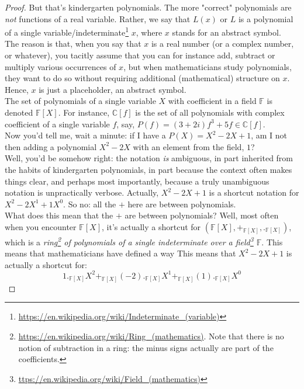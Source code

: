 \documentclass[solutions.tex]{subfiles}
\begin{document}
\begin{proof}
But that's kindergarten polynomials. The more "correct"
polynomials are \textit{not} functions of a real variable. Rather,
we say that $L(x)$ or $L$ is a polynomial of a single
variable/indeterminate\footnote{
\url{https://en.wikipedia.org/wiki/Indeterminate\_(variable)}} $x$, where
$x$ stands for an abstract symbol. \\

The reason is that, when you say that $x$ is a real number (or
a complex number, or whatever), you tacitly assume that you can
for instance add, subtract or multiply various occurrences of
$x$, but when mathematicians study polynomials, they want to do
so without requiring additional (mathematical) structure on $x$. \\

Hence, $x$ is just a placeholder, an abstract symbol. \\

The set of polynomials of a single variable $X$ with coefficient
in a field $\mathbb{F}$ is denoted $\mathbb{F}[X]$. For instance,
$\mathbb{C}[f]$ is the set of all polynomials with complex
coefficient of a single variable $f$, say,
$P(f) = (3+2i)f^3 + 5f \in \mathbb{C}[f]$. \\

Now you'd tell me, wait a minute: if I have a $P(X) = X^2 - 2X +1$,
am I not then adding a polynomial $X^2-2X$ with an element from
the field, $1$? \\

Well, you'd be somehow right: the notation \textit{is} ambiguous, in
part inherited from the habits of kindergarten polynomials, in part
because the context often makes things clear, and perhaps
most importantly, because a truly unambiguous notation is unpractically
verbose. Actually, $X^2 - 2X +1$ is a shortcut
notation for $X^2 - 2X^1 +1 X^0$. So no: all the $+$ here are between
polynomials. \\

What does this mean that the $+$ are between polynomials? Well, most
often when you encounter $\mathbb{F}[X]$, it's actually
a shortcut for $(\mathbb{F}[X], +_{\mathbb{F}[X]}, ._{\mathbb{F}[X]})$,
which is a \textit{ring\footnote{\url{
https://en.wikipedia.org/wiki/Ring\_(mathematics)}. Note that there
is no notion of subtraction in a ring: the minus signs actually are
part of the coefficients.} of polynomials of a single indeterminate
over a field\footnote{\url{
ttps://en.wikipedia.org/wiki/Field\_(mathematics)}} $\mathbb{F}$}.
This means that mathematicians have defined a way
This means that  $X^2 - 2X +1$ is actually a shortcut for:
\[
	1._{\mathbb{F}[X]}X^2 +_{\mathbb{F}[X]} (-2)._{\mathbb{F}[X]}X^1
		+_{\mathbb{F}[X]} (1)._{\mathbb{F}[X]}X^0
\]


\end{proof}
\end{document}
